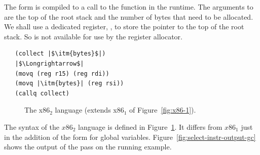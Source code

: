 \documentclass[11pt]{book}
\newcommand{\gray}[1]{{\color{lightgray} #1}}
\begin{document}
The  form is compiled to a call to the 
function in the runtime. The arguments to  are the top
of the root stack and the number of bytes that need to be allocated.
We shall use a dedicated register, , to store the pointer to
the top of the root stack. So  is not available for use by
the register allocator.
\begin{lstlisting}
   (collect |$\itm{bytes}$|)
   |$\Longrightarrow$|
   (movq (reg r15) (reg rdi))
   (movq |\itm{bytes}| (reg rsi))
   (callq collect)
\end{lstlisting}


\begin{figure}[tp]
\fbox{
\begin{minipage}{0.96\textwidth}
\[
\begin{array}{lcl}
\Arg &::=&  \gray{  \INT{\Int} \mid \REG{\itm{register}}
    \mid (\key{deref}\,\itm{register}\,\Int) } \\
   &\mid& \gray{ (\key{byte-reg}\; \itm{register})  }
   \mid (\key{global-value}\; \itm{name}) \\
\itm{cc} & ::= & \gray{  \key{e} \mid \key{l} \mid \key{le} \mid \key{g} \mid \key{ge}  } \\
\Instr &::=& \gray{(\key{addq} \; \Arg\; \Arg) \mid
             (\key{subq} \; \Arg\; \Arg) \mid
             (\key{negq} \; \Arg) \mid (\key{movq} \; \Arg\; \Arg)} \\
      &\mid& \gray{(\key{callq} \; \mathit{label}) \mid
             (\key{pushq}\;\Arg) \mid
             (\key{popq}\;\Arg) \mid
             (\key{retq})} \\
       &\mid& \gray{  (\key{xorq} \; \Arg\;\Arg)
       \mid (\key{cmpq} \; \Arg\; \Arg) \mid (\key{set}\itm{cc} \; \Arg)  } \\
       &\mid& \gray{  (\key{movzbq}\;\Arg\;\Arg)
       \mid  (\key{jmp} \; \itm{label})
       \mid (\key{j}\itm{cc} \; \itm{label})
       \mid (\key{label} \; \itm{label})  } \\
x86_2 &::= & \gray{  (\key{program} \;\itm{info} \;(\key{type}\;\itm{type})\; \Instr^{+})  }
\end{array}
\]
\end{minipage}
}
\caption{The x86$_2$ language (extends x86$_1$ of Figure~\ref{fig:x86-1}).}
\label{fig:x86-2}
\end{figure}

The syntax of the $x86_2$ language is defined in
Figure~\ref{fig:x86-2}.  It differs from $x86_1$ just in the addition
of the form for global variables.
%
Figure~\ref{fig:select-instr-output-gc} shows the output of the
 pass on the running example.
\end{document}
